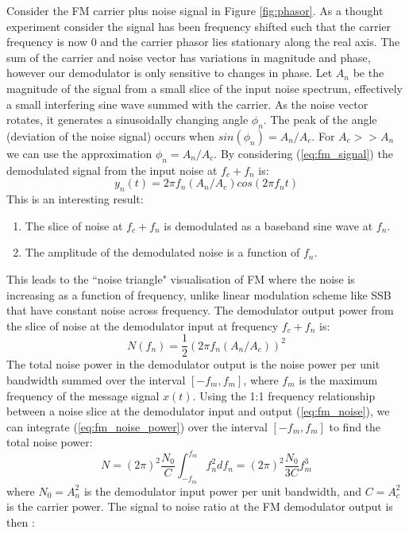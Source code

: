 \documentclass{article}
\begin{document}
Consider the FM carrier plus noise signal in Figure \ref{fig:phasor}.  As a thought experiment consider the signal has been frequency shifted such that the carrier frequency is now 0 and the carrier phasor lies stationary along the real axis.  The sum of the carrier and noise vector has variations in magnitude and phase, however our demodulator is only sensitive to changes in phase. Let $A_n$ be the magnitude of the signal from a small slice of the input noise spectrum, effectively a small interfering sine wave summed with the carrier. As the noise vector rotates, it generates a sinusoidally changing angle $\phi_n$.  The peak of the angle (deviation of the noise signal) occurs when $sin(\phi_n) = A_n/A_c$. For $A_c>>A_n$ we can use the approximation $\phi_n=A_n/A_c$.  By considering (\ref{eq:fm_signal}) the demodulated signal from the input noise at $f_c+f_n$ is:
\begin{equation}
\label{eq:fm_noise}
y_n(t) = 2 \pi f_n (A_n/A_c) cos(2 \pi f_n t)
\end{equation}
This is an interesting result:
\begin{enumerate}
\item The slice of noise at $f_c+f_n$ is demodulated as a baseband sine wave at $f_n$.
\item The amplitude of the demodulated noise is a function of $f_n$.
\end{enumerate}
This leads to the ``noise triangle" visualisation of FM where the noise is increasing as a function of frequency, unlike linear modulation scheme like SSB that have constant noise across frequency. The demodulator output power from the slice of noise at the demodulator input at frequency $f_c+f_n$ is:
\begin{equation}
\label{eq:fm_noise_power}
N(f_n) =  \frac{1}{2}(2 \pi f_n (A_n/A_c) )^2 
\end{equation}
The total noise power in the demodulator output is the noise power per unit bandwidth summed over the interval $[-f_m,f_m]$, where $f_m$ is the maximum frequency of the message signal $x(t)$. Using the 1:1 frequency relationship between a noise slice at the demodulator input and output (\ref{eq:fm_noise}), we can integrate (\ref{eq:fm_noise_power}) over the interval $[-f_m,f_m]$ to find the total noise power:
\begin{equation}
N = (2\pi)^2 \frac{N_0}{C} \int_{-f_m}^{f_m} f_n^2 df_n = (2\pi)^2 \frac{N_0}{3C} f_m^3
\end{equation}
where $N_0=A_n^2$ is the demodulator input power per unit bandwidth, and $C=A_c^2$ is the carrier power.  The signal to noise ratio at the FM demodulator output is then \cite{crilly2009communication}:
\end{document}
